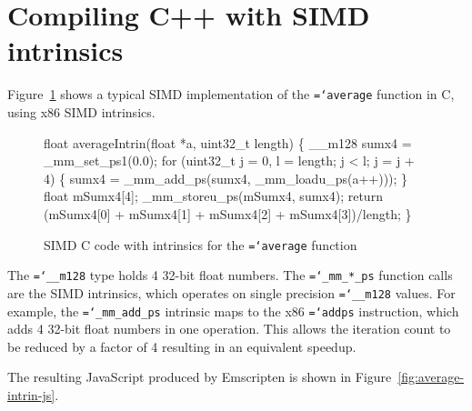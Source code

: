 \documentclass[preprint]{sigplanconf}
\newcommand{\ttt}[1]{{\texttt{\hyphenchar\font=`\-\relax #1}}}%
\begin{document}
\section{Compiling C++ with SIMD intrinsics}

Figure~\ref{fig:average-intrin} shows a typical SIMD implementation of the
\ttt{average} function in C, using x86 SIMD intrinsics.

\begin{figure}
\begin{small}
\begin{program}[style=tt, number=true]
fl\tab{}oat averageIntrin(float *a, uint32\_t length) \{
  \_\_m128 sumx4 = \_mm\_set\_ps1(0.0);
  fo\tab{}r (uint32\_t j = 0, l = length; j < l; j = j + 4) \{
    sumx4 = \_mm\_add\_ps(sumx4, \_mm\_loadu\_ps(a++)));\untab{}
  \}
  float mSumx4[4];
  \_mm\_storeu\_ps(mSumx4, sumx4);
  return (\tab{}mSumx4[0] + mSumx4[1] +
          mSumx4[2] + mSumx4[3])/length;\untab{}\untab{}
\}
\end{program}
\end{small}
\caption{SIMD C code with intrinsics for the \ttt{average} function}
\label{fig:average-intrin}
\end{figure}

The \ttt{\_\_m128} type holds 4 32-bit float numbers.  The \ttt{\_mm\_*\_ps}
function calls are the SIMD intrinsics, which operates on single precision 
\ttt{\_\_m128} values.  For example, the \ttt{\_mm\_add\_ps} intrinsic maps 
to the x86 \ttt{addps} instruction, which adds 4 32-bit float numbers in one 
operation.  This allows the iteration count to be reduced by a factor of 4
resulting in an equivalent speedup.

The resulting JavaScript produced by Emscripten is shown in
Figure~\ref{fig:average-intrin-js}.
\end{document}
